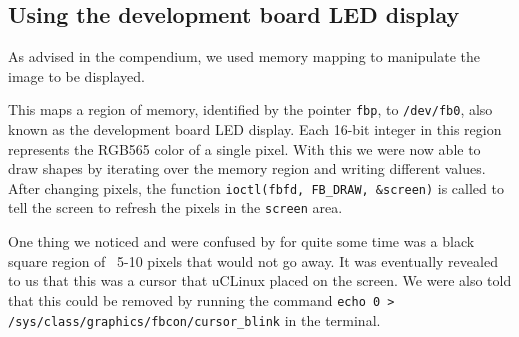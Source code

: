 \subsection{Using the development board LED display}
As advised in the compendium, we used memory mapping to manipulate the image to be displayed.



This maps a region of memory, identified by the pointer \texttt{fbp}, to \texttt{/dev/fb0}, also known as the development board LED display.
Each 16-bit integer in this region represents the RGB565 color of a single pixel.
With this we were now able to draw shapes by iterating over the memory region and writing different values.
After changing pixels, the function \texttt{ioctl(fbfd, FB\_DRAW, &screen)} is called to tell the screen to refresh the pixels in the \texttt{screen} area.

One thing we noticed and were confused by for quite some time was a black square region of ~5-10 pixels that would not go away.
It was eventually revealed to us that this was a cursor that uCLinux placed on the screen.
We were also told that this could be removed by running the command \texttt{echo 0 > /sys/class/graphics/fbcon/cursor\_blink} in the terminal.
